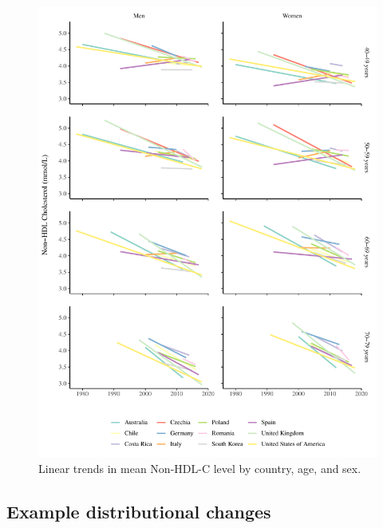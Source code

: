\documentclass[12pt]{article}
\begin{document}
\begin{appendix}
    \begin{figure}[H]
        \centering
        \includegraphics[width=0.9\linewidth]{../3_figures/figS_mean_chol_trends.pdf}
        \caption{Linear trends in mean Non-HDL-C level by country, age, and sex.}
        \label{fig:trends}
    \end{figure}
    \newpage 

    \begin{landscape}
        \subsection{Example distributional changes}


\end{landscape}
\end{appendix}
\end{document}
